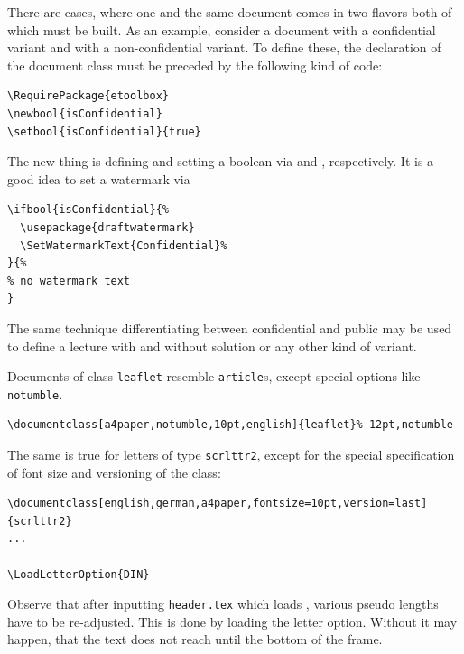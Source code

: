 There are cases, where one and the same document 
comes in two flavors both of which must be built. 
As an example, consider a document with a confidential variant 
and with a non-confidential variant. 
To define these, the declaration of the document class 
must be preceded by the following kind of code: 
%
\begin{Verbatim}[fontsize=\small]
\RequirePackage{etoolbox}
\newbool{isConfidential}
\setbool{isConfidential}{true}
\end{Verbatim}

The new thing is defining and setting a boolean 
via  and , respectively. 
It is a good idea to set a watermark via 
%
\begin{Verbatim}[fontsize=\small]
\ifbool{isConfidential}{%
  \usepackage{draftwatermark}
  \SetWatermarkText{Confidential}%
}{%
% no watermark text
}
\end{Verbatim}

The same technique differentiating between confidential and public 
may be used to define a lecture with and without solution 
or any other kind of variant. 

Documents of class \texttt{leaflet} resemble \texttt{article}s, 
except special options like \texttt{notumble}. 

\begin{Verbatim}[fontsize=\footnotesize]
  \documentclass[a4paper,notumble,10pt,english]{leaflet}% 12pt,notumble
\end{Verbatim}

The same is true for letters of type \texttt{scrlttr2}, 
except for the special specification of font size and versioning of the class: 

\begin{Verbatim}[fontsize=\footnotesize]
\documentclass[english,german,a4paper,fontsize=10pt,version=last]{scrlttr2}
...

\LoadLetterOption{DIN}
\end{Verbatim}

Observe that after inputting \texttt{header.tex} which loads , 
various pseudo lengths have to be re-adjusted. 
This is done by loading the letter option. 
Without it may happen, that the text does not reach until the bottom of the frame. 


